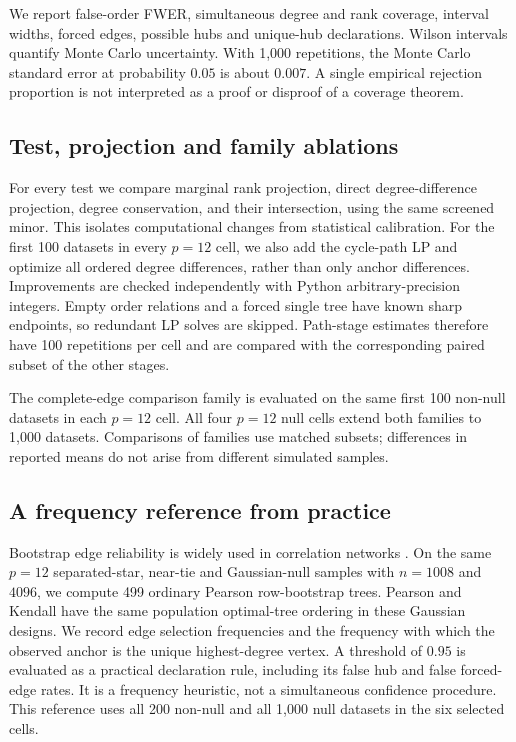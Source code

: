 We report false-order FWER, simultaneous degree and rank coverage, interval widths, forced edges, possible hubs and unique-hub declarations. Wilson intervals quantify Monte Carlo uncertainty. With 1,000 repetitions, the Monte Carlo standard error at probability $0.05$ is about $0.007$. A single empirical rejection proportion is not interpreted as a proof or disproof of a coverage theorem.

\subsection{Test, projection and family ablations}
For every test we compare marginal rank projection, direct degree-difference projection, degree conservation, and their intersection, using the same screened minor. This isolates computational changes from statistical calibration. For the first 100 datasets in every $p=12$ cell, we also add the cycle-path LP and optimize all ordered degree differences, rather than only anchor differences. Improvements are checked independently with Python arbitrary-precision integers. Empty order relations and a forced single tree have known sharp endpoints, so redundant LP solves are skipped. Path-stage estimates therefore have 100 repetitions per cell and are compared with the corresponding paired subset of the other stages.

The complete-edge comparison family is evaluated on the same first 100 non-null datasets in each $p=12$ cell. All four $p=12$ null cells extend both families to 1,000 datasets. Comparisons of families use matched subsets; differences in reported means do not arise from different simulated samples.

\subsection{A frequency reference from practice}
Bootstrap edge reliability is widely used in correlation networks \citep{tumminello2007,musciotto2018}. On the same $p=12$ separated-star, near-tie and Gaussian-null samples with $n=1008$ and $4096$, we compute 499 ordinary Pearson row-bootstrap trees. Pearson and Kendall have the same population optimal-tree ordering in these Gaussian designs. We record edge selection frequencies and the frequency with which the observed anchor is the unique highest-degree vertex. A threshold of $0.95$ is evaluated as a practical declaration rule, including its false hub and false forced-edge rates. It is a frequency heuristic, not a simultaneous confidence procedure. This reference uses all 200 non-null and all 1,000 null datasets in the six selected cells.

